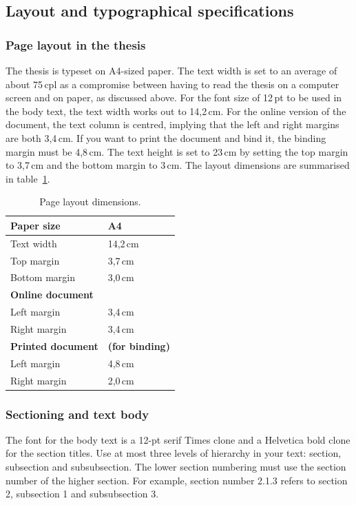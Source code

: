 \documentclass[english, 12pt, a4paper, elec, utf8, a-2b, online]{aaltothesis}
\begin{document}
\subsection*{Layout and typographical specifications}
\subsubsection*{Page layout in the thesis}

The thesis is typeset on A4-sized paper. The text width is set to an average of 
about 75\,cpl as a compromise between having to read the thesis on a computer 
screen and on paper, as discussed above. For the font size of 12\,pt to be used 
in the body text, the text width works out to 14,2\,cm. For the online version 
of the document, the text column is centred, implying that the left and right 
margins are both 3,4\,cm. If you want to print the document and bind it, the 
binding margin must be 4,8\,cm. The text height is set to 23\,cm by setting the 
top margin to 3,7\,cm and the bottom margin to 3\,cm. The layout dimensions are 
summarised in table~\ref{tab:layout}.

\begin{table}[htb]
	\centering
	\caption{Page layout dimensions.}
	\label{tab:layout}
	\sffamily%
	\begin{tabular}{ll}
		\hline
		Paper size & A4\\\hline
		Text width & 14,2\,cm \\\hline
		Top margin & 3,7\,cm \\\hline
		Bottom margin & 3,0\,cm \\\hline
		\textbf{Online document} & \\\hline
		Left margin & 3,4\,cm \\\hline
		Right margin & 3,4\,cm \\\hline
		\textbf{Printed document} & \textbf{(for binding)} \\\hline
		Left margin & 4,8\,cm \\\hline
		Right margin & 2,0\,cm \\\hline
	\end{tabular}
\end{table}


\subsubsection*{Sectioning and text body}

The font for the body text is a 12-pt serif Times clone and a Helvetica bold 
clone for the section titles. Use at most three levels of hierarchy in your 
text: section, subsection and subsubsection. The lower section numbering must 
use the section number of the higher section. For example, section number 2.1.3 
refers to section 2, subsection 1 and subsubsection 3.
\end{document}
